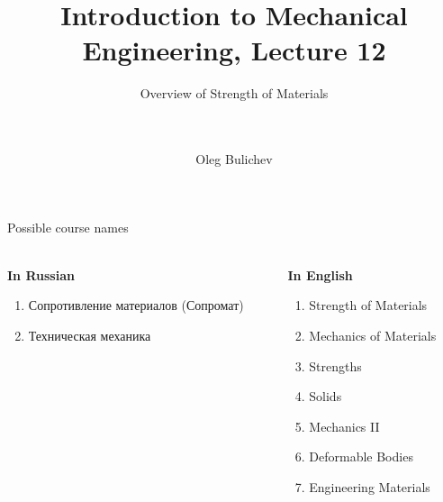 \documentclass[aspectratio=169]{beamer}
\title[IME]{Introduction to Mechanical Engineering, Lecture 12} %
\subtitle{Overview of Strength of Materials  
\\ \   \\   
\ } %
\author{Oleg Bulichev}
\newcommand{\fbckg}[1]{\usebackgroundtemplate{\texttt{[image: \#1]}}}%
\begin{document}
\setlength{\abovedisplayskip}{0pt}
\setlength{\belowdisplayskip}{0pt}
\setlength{\abovedisplayshortskip}{0pt}
\setlength{\belowdisplayshortskip}{0pt}

\fbckg{fibeamer/figs/title_page.png}

\fbckg{fibeamer/figs/common.png}

\note{\scriptsize \begin{itemize}
        \item \
    \end{itemize}}

\begin{frame}[t]{Possible course names}
\framesubtitle{}
    \begin{columns}[T,onlytextwidth]
        \begin{column}{0.49\textwidth}
            \textbf{In Russian}
            \begin{enumerate}
                \item Сопротивление материалов (Сопромат)
                \item Техническая механика
            \end{enumerate}
        \end{column}
        \begin{column}{0.49\textwidth}
            \textbf{In English}
            \begin{enumerate}
                \item Strength of Materials
                \item Mechanics of Materials
                \item Strengths
                \item Solids
                \item Mechanics II
                \item Deformable Bodies
                \item Engineering Materials
            \end{enumerate}
        \end{column}
    \end{columns}
\end{frame}
\end{document}
